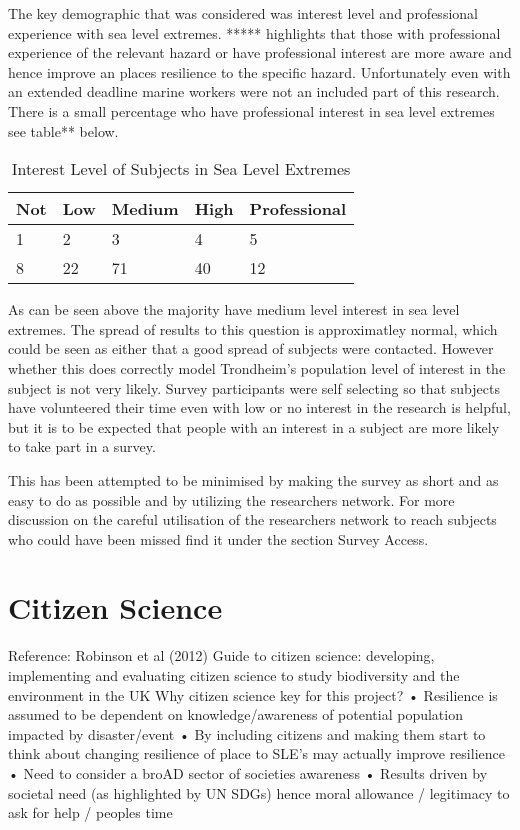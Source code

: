 The key demographic that was considered was interest level and professional experience with sea level extremes. ***** highlights that those with professional experience of the relevant hazard or have professional interest are more aware and hence improve an places resilience to the specific hazard. Unfortunately even with an extended deadline marine workers were not an included part of this research. There is a small percentage who have professional interest in sea level extremes see table** below. 

\begin{table}[!ht]
    \centering
    \begin{tabular}{|l|l|l|l|l|}
    \hline
        Not & Low & Medium & High & Professional \\ \hline
        1 & 2 & 3 & 4 & 5 \\ \hline
        8 & 22 & 71 & 40 & 12 \\ \hline
    \end{tabular}
    \caption{Interest Level of Subjects in Sea Level Extremes}
    \label{interest_level_table}
\end{table}

As can be seen above the majority have medium level interest in sea level extremes. The spread of results to this question is approximatley normal, which could be seen as either that a good spread of subjects were contacted. However whether this does correctly model Trondheim's population level of interest in the subject is not very likely.  Survey participants were self selecting so that subjects have volunteered their time even with low or no interest in the research is helpful, but it is to be expected that people with an interest in a subject are more likely to take part in a survey.

This has been attempted to be minimised by making the survey as short and as easy to do as possible and by utilizing the researchers network. For more discussion on the careful utilisation of the researchers network to reach subjects who could have been missed find it under the section Survey Access. 

\section{Citizen Science}
Reference: Robinson et al (2012) Guide to citizen science: developing, implementing and evaluating citizen science to study biodiversity and the environment in the UK 
Why citizen science key for this project?
•	Resilience is assumed to be dependent on knowledge/awareness of potential population impacted by disaster/event
•	By including citizens and making them start to think about changing resilience of place to SLE’s may actually improve resilience
•	Need to consider a broAD sector of societies awareness
•	Results driven by societal need (as highlighted by UN SDGs) hence moral allowance / legitimacy to ask for help / peoples time

